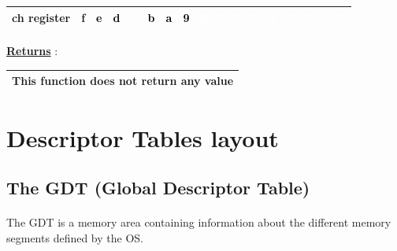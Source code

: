 \documentclass[12pt,letterpaper]{article}
\begin{document}
\begin{center}
\begin{tabularx}{0.9\textwidth}{ |Y|c|c|c|c|c|c|c|c|c|c|c|c|c|c|c|c| }
    \hline
    ch register 
    & f 
    & \textcolor{black}{e}
    & \textcolor{black}{d}
    & \textcolor{white}{c}
    & \textcolor{black}{b}
    & \textcolor{black}{a}
    & \textcolor{black}{9}
    & \textcolor{white}{8}
    & \textcolor{white}{7}
    & \textcolor{white}{6}
    & \textcolor{white}{5}
    & \textcolor{white}{4}
    & \textcolor{white}{3}
    & \textcolor{white}{2} 
    & \textcolor{white}{1} 
    & \textcolor{white}{0} \\
    \hline
\end{tabularx}
\label{table:VGA_colors}
\end{center}

\paragraph{}
\textbf{\underline{Returns}} :
\begin{center}
\begin{tabularx}{0.5\textwidth}{ |Y| }
    \hline
    This function does not return any value \\
    \hline
\end{tabularx}
\end{center}

\newpage
\section{Descriptor Tables layout}
\subsection{The GDT (Global Descriptor Table)}
\paragraph{}
The GDT is a memory area containing information about the different memory segments defined by the OS.
\end{document}
